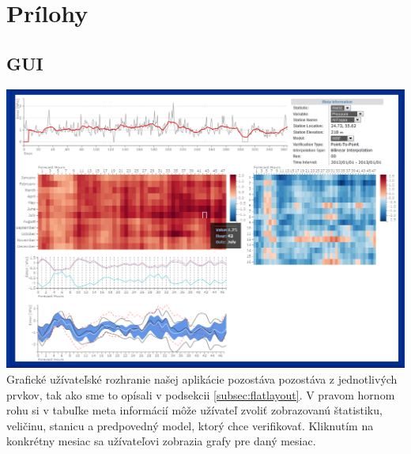 \appendix
\chapter{Prílohy}

\section{GUI}
{ \hspace*{-0.3in}
\includegraphics[width=7in]{gui} 
}
Grafické užívateľské rozhranie našej aplikácie pozostáva pozostáva z jednotlivých prvkov, tak ako sme to opísali v podsekcii \ref{subsec:flatlayout}. V pravom hornom rohu si v tabuľke meta informácií môže užívateľ zvoliť zobrazovanú štatistiku, veličinu, stanicu a predpovedný model, ktorý chce verifikovať. Kliknutím na konkrétny mesiac sa užívateľovi zobrazia grafy pre daný mesiac.

